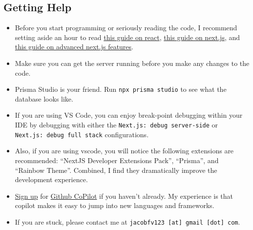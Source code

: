 \hypertarget{getting-help}{%
\subsection{Getting Help}\label{getting-help}}

\begin{itemize}
\item
  Before you start programming or seriously reading the code, I
  recommend setting aside an hour to read
  \href{https://nextjs.org/learn/foundations/from-javascript-to-react}{this
  guide on react},
  \href{https://nextjs.org/learn/foundations/from-react-to-nextjs}{this
  guide on next.js}, and
  \href{https://nextjs.org/learn/foundations/how-nextjs-works}{this
  guide on advanced next.js features}.
\item
  Make sure you can get the server running before you make any changes
  to the code.
\item
  Prisma Studio is your friend. Run \texttt{npx\ prisma\ studio} to see
  what the database looks like.
\item
  If you are using VS Code, you can enjoy break-point debugging within
  your IDE by debugging with either the
  \texttt{Next.js:\ debug\ server-side} or
  \texttt{Next.js:\ debug\ full\ stack} configurations.
\item
  Also, if you are using vscode, you will notice the following
  extensions are recommended: ``NextJS Developer Extensions Pack'',
  ``Prisma'', and ``Rainbow Theme''. Combined, I find they dramatically
  improve the development experience.
\item
  \href{https://github.com/features/copilot/signup}{Sign up} for
  \href{https://copilot.github.com/}{Github CoPilot} if you haven't
  already. My experience is that copilot makes it easy to jump into new
  languages and frameworks.
\item
  If you are stuck, please contact me at
  \texttt{jacobfv123\ {[}at{]}\ gmail\ {[}dot{]}\ com}.
\end{itemize}
